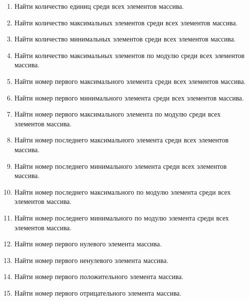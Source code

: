 \labtask

\begin{enumerate}

	\item Найти количество единиц среди всех элементов массива.

	\item Найти количество максимальных элементов среди всех элементов массива.

	\item Найти количество минимальных элементов среди всех элементов массива.

	\item Найти количество максимальных элементов по модулю среди всех элементов массива.

	\item Найти номер первого максимального элемента среди всех элементов массива.

	\item Найти номер первого минимального элемента среди всех элементов массива.

	\item Найти номер первого максимального элемента по модулю среди всех элементов массива.

	\item Найти номер последнего максимального элемента среди всех элементов массива.

	\item Найти номер последнего минимального элемента среди всех элементов массива.

	\item Найти номер последнего максимального по модулю элемента среди всех элементов массива.

	\item Найти номер последнего минимального по модулю элемента среди всех элементов массива.

	\item Найти номер первого нулевого элемента массива.

	\item Найти номер первого ненулевого элемента массива.

	\item Найти номер первого положительного элемента массива.

	\item Найти номер первого отрицательного элемента массива.

\end{enumerate}

\reservedtasks

